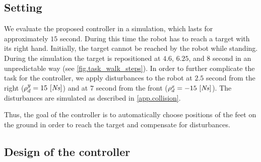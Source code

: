 \subsection{Setting}\label{sec.task_walk_setting}

We evaluate the proposed controller in a simulation, which lasts for
approximately $15$ second. During this time the robot has to reach a target
with its right hand. Initially, the target cannot be reached by the robot while
standing. During the simulation the target is repositioned at $4.6$, $6.25$,
and $8$ second in an unpredictable way (see \cref{fig.task_walk_steps}). In
order to further complicate the task for the controller, we apply disturbances
to the robot at $2.5$ second from the right ($\rho_d^y = 15~[\mathit{Ns}]$)
and at $7$ second from the front ($\rho_d^x = -15~[\mathit{Ns}]$). The
disturbances are simulated as described in \cref{app.collision}.


Thus, the goal of the controller is to automatically choose positions of the
feet on the ground in order to reach the target and compensate for
disturbances.



\subsection{Design of the controller}\label{sec.task_walk_controller}


